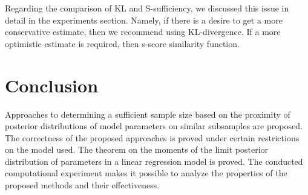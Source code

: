 \documentclass[sn-mathphys-num]{sn-jnl}%
\begin{document}
Regarding the comparison of KL and S-sufficiency, we discussed this issue in detail in the experiments section. Namely, if there is a desire to get a more conservative estimate, then we recommend using KL-divergence. If a more optimistic estimate is required, then s-score similarity function.

\section{Conclusion}

Approaches to determining a sufficient sample size based on the proximity of posterior distributions of model parameters on similar subsamples are proposed. The correctness of the proposed approaches is proved under certain restrictions on the model used. The theorem on the moments of the limit posterior distribution of parameters in a linear regression model is proved. The conducted computational experiment makes it possible to analyze the properties of the proposed methods and their effectiveness.
\end{document}
